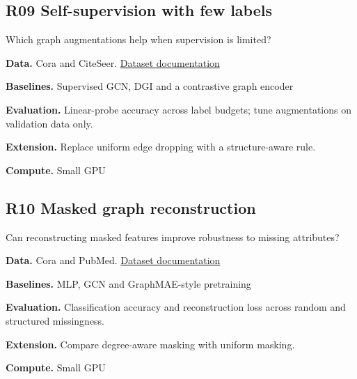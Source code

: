 \documentclass[11pt,letterpaper]{article}
\begin{document}
\begin{minipage}{\linewidth}\subsection*{R09 Self-supervision with few labels}
Which graph augmentations help when supervision is limited?\par\textbf{Data.} Cora and CiteSeer. \href{https://pytorch-geometric.readthedocs.io/en/latest/generated/torch_geometric.datasets.Planetoid.html}{Dataset documentation}\par
\textbf{Baselines.} Supervised GCN, DGI and a contrastive graph encoder\par
\textbf{Evaluation.} Linear-probe accuracy across label budgets; tune augmentations on validation data only.\par
\textbf{Extension.} Replace uniform edge dropping with a structure-aware rule.\par
\textbf{Compute.} Small GPU\par
\end{minipage}\par\vspace{8pt}
\begin{minipage}{\linewidth}\subsection*{R10 Masked graph reconstruction}
Can reconstructing masked features improve robustness to missing attributes?\par\textbf{Data.} Cora and PubMed. \href{https://pytorch-geometric.readthedocs.io/en/latest/generated/torch_geometric.datasets.Planetoid.html}{Dataset documentation}\par
\textbf{Baselines.} MLP, GCN and GraphMAE-style pretraining\par
\textbf{Evaluation.} Classification accuracy and reconstruction loss across random and structured missingness.\par
\textbf{Extension.} Compare degree-aware masking with uniform masking.\par
\textbf{Compute.} Small GPU\par
\end{minipage}\par\vspace{8pt}
\end{document}
